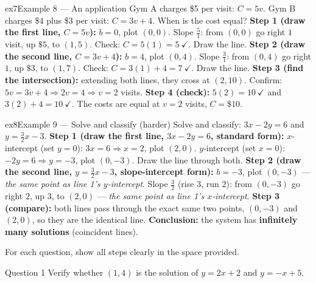 \documentclass[11pt]{article}
\begin{document}
\begin{example}{ex7}{Example 8 --- An application}
Gym A charges \$5 per visit: $C=5v$. Gym B charges \$4 plus \$3 per visit: $C=3v+4$. When is the cost equal?
\soln \textbf{Step 1 (draw the first line, $C=5v$):} $b=0$, plot $(0,0)$. Slope $\tfrac51$: from $(0,0)$ go right $1$ visit, up $\$5$, to $(1,5)$. Check: $C=5(1)=5\ \checkmark$. Draw the line.
\textbf{Step 2 (draw the second line, $C=3v+4$):} $b=4$, plot $(0,4)$. Slope $\tfrac31$: from $(0,4)$ go right $1$, up $\$3$, to $(1,7)$. Check: $C=3(1)+4=7\ \checkmark$. Draw the line.
\textbf{Step 3 (find the intersection):} extending both lines, they cross at $(2,10)$. Confirm: $5v=3v+4\Rightarrow 2v=4\Rightarrow v=2$ visits.
\textbf{Step 4 (check):} $5(2)=10\ \checkmark$ and $3(2)+4=10\ \checkmark$. The costs are equal at $v=2$ visits, $C=\$10$.
\end{example}

\begin{example}{ex8}{Example 9 --- Solve and classify (harder)}
Solve and classify: $3x-2y=6$ and $y=\tfrac32x-3$.
\soln \textbf{Step 1 (draw the first line, $3x-2y=6$, standard form):} $x$-intercept (set $y=0$): $3x=6\Rightarrow x=2$, plot $(2,0)$. $y$-intercept (set $x=0$): $-2y=6\Rightarrow y=-3$, plot $(0,-3)$. Draw the line through both.
\textbf{Step 2 (draw the second line, $y=\tfrac32x-3$, slope-intercept form):} $b=-3$, plot $(0,-3)$ --- \emph{the same point as line 1's $y$-intercept}. Slope $\tfrac32$ (rise $3$, run $2$): from $(0,-3)$ go right $2$, up $3$, to $(2,0)$ --- \emph{the same point as line 1's $x$-intercept}.
\textbf{Step 3 (compare):} both lines pass through the exact same two points, $(0,-3)$ and $(2,0)$, so they are the identical line.
\textbf{Conclusion:} the system has \textbf{infinitely many solutions} (coincident lines).
\end{example}

\clearpage
{}
For each question, show all steps clearly in the space provided.

\begin{qbox}{Question 1}
Verify whether $(1,4)$ is the solution of $y=2x+2$ and $y=-x+5$.\workspace{2.4cm}
\end{qbox}
\end{document}
